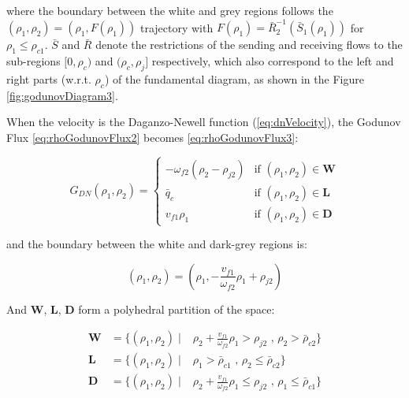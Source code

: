 \noindent where the boundary between the white and grey regions follows the $(\rho_{1},\rho_{2})=(\rho_{1},F(\rho_{1}))$ trajectory with $F(\rho_{1})= \bar{R}^{-1}_{2}(\bar{S}_{1}(\rho_{1}))$ for $\rho_{1} \leq \rho_{c1}$. $\bar{S}$ and $\bar{R}$ denote the restrictions of the sending and receiving flows to the sub-regions $[0,\rho_{c})$ and $(\rho_{c},\rho_{j}]$ respectively, which also correspond to the left and right parts (w.r.t. $\rho_{c}$) of the fundamental diagram, as shown in the Figure \ref{fig:godunovDiagram3}.

\noindent When the velocity is the Daganzo-Newell function (\ref{eq:dnVelocity}), the Godunov Flux \ref{eq:rhoGodunovFlux2} becomes \ref{eq:rhoGodunovFlux3}:

\begin{equation} \label{eq:rhoGodunovFlux3a}
G_{DN}(\rho_{1},\rho_{2}) = \begin{cases}
-\omega_{f2} \left( \rho_{2} - \rho_{j2} \right) & \text{if } (\rho_{1},\rho_{2}) \in \textbf{W}\\
\bar{q}_{c} & \text{if } (\rho_{1},\rho_{2}) \in \textbf{L}\\
v_{f1} \rho_{1} & \text{if } (\rho_{1},\rho_{2}) \in \textbf{D}
\end{cases}
\end{equation}

\noindent and the boundary between the white and dark-grey regions is:

\begin{equation} \label{eq:boundaryHetero}
(\rho_{1},\rho_{2})=(\rho_{1},-\frac{v_{f1}}{\omega_{f2}}\rho_{1}+\rho_{j2})
\end{equation}

\noindent And \textbf{W}, \textbf{L}, \textbf{D} form a polyhedral partition of the space:

\begin{equation}
\begin{array}{lll}
\textbf{W} & = \{(\rho_{1},\rho_{2}) \mid & \rho_{2} + \frac{v_{f1}}{\omega_{f2}}\rho_{1} > \rho_{j2} \text{ ,   } \rho_{2} > \bar{\rho}_{c2}\}\\
\textbf{L} & = \{(\rho_{1},\rho_{2}) \mid & \rho_{1} > \bar{\rho}_{c1} \text{ ,   } \rho_{2} \leq \bar{\rho}_{c2}\}\\
\textbf{D} & = \{(\rho_{1},\rho_{2}) \mid & \rho_{2} + \frac{v_{f1}}{\omega_{f2}}\rho_{1} \leq \rho_{j2} \text{ ,   } \rho_{1} \leq \bar{\rho}_{c1}\}
\end{array}
\label{eq:regions4}
\end{equation}

